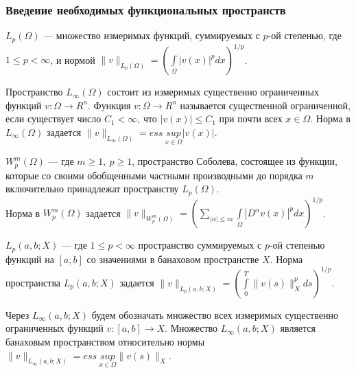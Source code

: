 \documentclass[10pt, pdf, hyperref={unicode}]{beamer}
\begin{document}
    \begin{frame}
        \frametitle{Введение необходимых функциональных пространств}
        \begin{center}
            \begin{minipage}[h]{0.97\linewidth}
$L_p(\Omega)$ --- множество измеримых функций, суммируемых с $p$-ой степенью, где $1\le p< \infty$,
и нормой $\|v\|_{L_p(\Omega)}=(\int\limits_\Omega |v(x)|^pdx)^{1/p}$.

Пространство $L_{\infty}(\Omega)$ состоит из измеримых существенно ограниченных функций $v:\Omega\rightarrow R^n$. 
Функция $v:\Omega\rightarrow R^n$ называется существенной ограниченной, если существует число $C_1<\infty$, что $|v(x)|\le C_1$ при почти всех $x\in\Omega$.
Норма в $L_{\infty}(\Omega)$ задается
$\|v\|_{L_{\infty}(\Omega)}=ess \ \underset{x\in\Omega}{sup} |v(x)|$.

$W_p^m(\Omega)$ --- где $m\geqslant 1, \ p\geqslant 1$, пространство Соболева, состоящее из
функции, которые со своими обобщенными частными производными до порядка $m$ включительно принадлежат пространству $L_p(\Omega)$.\\
Норма в $W_p^m(\Omega)$ задается $\|v\|_{W_p^m(\Omega)}=\left(\sum\limits_{|\alpha|\leqslant m} \int\limits_\Omega |D^{\alpha}v(x)|^pdx\right)^{1/p}$.

$L_p(a,b;X)$ --- где $1\le p< \infty$ пространство суммируемых с $p$-ой степенью функций на $[a, b]$ со значениями в
банаховом пространстве $X$. Норма пространства $L_p(a, b;X)$ задается 
$\|v\|_{L_p(a, b;X)}=(\int\limits_0^T\|v(s)\|_X^p ds)^{1/p}.$

Через $L_{\infty}(a,b;X)$ будем обозначать множество всех измеримых существенно ограниченных функций $v:[a,b]\rightarrow X$.
Множество $L_{\infty}(a,b;X)$ является банаховым пространством относительно нормы $\|v\|_{L_{\infty}(a,b;X)}=ess \ \underset{x\in\Omega}{sup} \|v(s)\|_X$.
            \end{minipage}
        \end{center}
    \end{frame}
\end{document}
